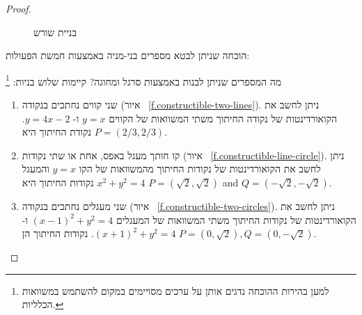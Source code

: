 \begin{proof}
\begin{figure}[b]
\begin{center}
\end{center}
\caption{בניית שורש}
\label{f.trisect-square-root}
\end{figure}

\medskip

הוכחה שניתן לבטא מספרים בני-מניה באמצעות חמשת הפעולות:

מה המספרים שניתן לבנות באמצעות סרגל ומחוגה? קיימות שלוש בניות:%
\footnote{למען בהירות ההוכחה נדגים אותן על ערכים מסויימים במקום להשתמש במשוואות הכלליות.}
\begin{enumerate}
\item
שני קווים נחתכים בנקודה (איור%
~\ref{f.constructible-two-lines}).
ניתן לחשב את הקואורדינטות של נקודה החיתוך משתי המשוואות של הקווים
$y=x$
ו-%
$y=4x-2$.
נקודת החיתוך היא
$P= (2/3, 2/3)$.

\item
קו חותך מעגל באפס, אחת או שתי נקודות (איור%
~\ref{f.constructible-line-circle}).
ניתן לחשב את הקואורדינטות של נקודות החיתוך מהמשוואות של הקו 
$y=x$
והמעגל
$x^2+y^2=4$
נקודות החיתוך היא
$P=(\sqrt{2}, \sqrt{2})$ and $Q=(-\sqrt{2}, -\sqrt{2})$.

\item
שני מעגלים נחתכים בנקודה (איור%
~\ref{f.constructible-two-circles}).
ניתן לחשב את הקואורדינטות של נקודות החיתוך משתי המשוואות של המעגלים
$(x-1)^2+y^2=4$
ו-%
$(x+1)^2+y^2=4$.
נקודות החיתוך הן
$P=(0,\sqrt{2}),Q=(0,-\sqrt{2})$.
\end{enumerate}
\end{proof}

